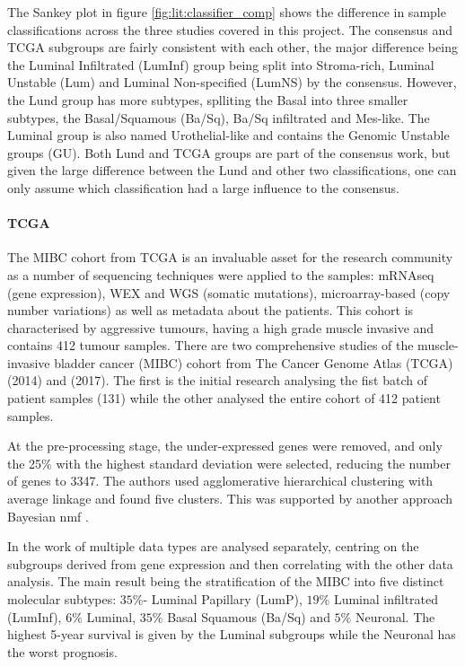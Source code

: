 The Sankey plot in figure \cref{fig:lit:classifier_comp} shows the difference in sample classifications across the three studies covered in this project. The consensus and TCGA subgroups are fairly consistent with each other, the major difference being the Luminal Infiltrated (LumInf) group being split into Stroma-rich, Luminal Unstable (Lum) and Luminal Non-specified (LumNS) by the consensus. However, the Lund group has more subtypes, splliting the Basal into three smaller subtypes, the Basal/Squamous (Ba/Sq), Ba/Sq infiltrated and Mes-like. The Luminal group is also named Urothelial-like and contains the Genomic Unstable groups (GU). Both Lund and TCGA groups are part of the consensus work, but given the large difference between the Lund and other two classifications, one can only assume which classification had a large influence to the consensus.


\paragraph*{TCGA} \label{s:lit:tcga_mibc}

The MIBC cohort from TCGA is an invaluable asset for the research community as a number of sequencing techniques were applied to the samples: mRNAseq (gene expression), WEX and WGS (somatic mutations), microarray-based (copy number variations) as well as metadata about the patients. This cohort is characterised by aggressive tumours, having a high grade muscle invasive and contains 412 tumour samples. There are two comprehensive studies of the muscle-invasive bladder cancer (MIBC) cohort from The Cancer Genome Atlas (TCGA) \citet{Tcga2014-dr} (2014) and \citet{Robertson2017-mg} (2017). The first is the initial research analysing the fist batch of patient samples (131) while the other analysed the entire cohort of 412 patient samples. 

At the pre-processing stage, the under-expressed genes were removed, and only the 25\% with the highest standard deviation were selected, reducing the number of genes to 3347. The authors used agglomerative hierarchical clustering with average linkage and found five clusters. This was supported by another approach Bayesian \acrfull{nmf} \cite{Schmidt2009-zh}.

In the work of \citet{Robertson2017-mg} multiple data types are analysed separately, centring on the subgroups derived from gene expression and then correlating with the other data analysis. The main result being the stratification of the MIBC into five distinct molecular subtypes: $35\%$- Luminal Papillary (LumP), $19\%$ Luminal infiltrated (LumInf), $6\%$ Luminal, $35\%$ Basal Squamous (Ba/Sq) and $5\%$ Neuronal. The highest 5-year survival is given by the Luminal subgroups while the Neuronal has the worst prognosis. 

